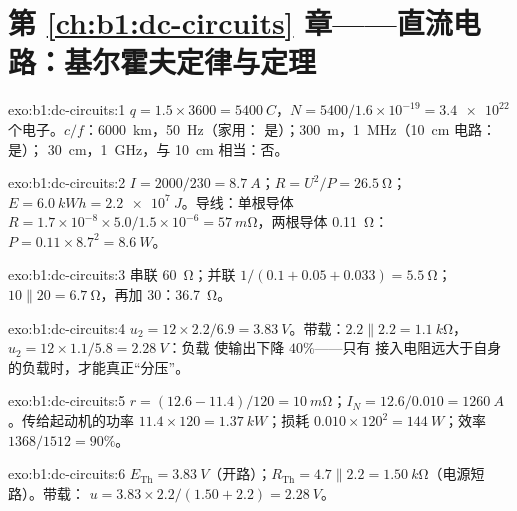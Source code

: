 \section*{第 \ref{ch:b1:dc-circuits} 章——直流电路：基尔霍夫定律与定理}

\begin{solution}{exo:b1:dc-circuits:1}
$q = 1.5 \times 3600 = \qty{5400}{C}$，$N = 5400/1.6\times10^{-19} =
\num{3.4e22}$ 个电子。$c/f$：\qty{6000}{km}，\qty{50}{Hz}（家用：
是）；\qty{300}{m}，\qty{1}{MHz}（\qty{10}{cm} 电路：是）；
\qty{30}{cm}，\qty{1}{GHz}，与 \qty{10}{cm} 相当：否。
\end{solution}

\begin{solution}{exo:b1:dc-circuits:2}
$I = 2000/230 = \qty{8.7}{A}$；$R = U^2/P = \qty{26.5}{\ohm}$；$E =
\qty{6.0}{kWh} = \qty{2.2e7}{J}$。导线：单根导体 $R = 1.7\times10^{-8}
\times 5.0/1.5\times10^{-6} = \qty{57}{m\ohm}$，两根导体
\qty{0.11}{\ohm}：$P = 0.11 \times 8.7^2 = \qty{8.6}{W}$。
\end{solution}

\begin{solution}{exo:b1:dc-circuits:3}
串联 \qty{60}{\ohm}；并联 $1/(0.1 + 0.05 + 0.033) = \qty{5.5}{\ohm}$；
$10 \parallel 20 = \qty{6.7}{\ohm}$，再加 $30$：\qty{36.7}{\ohm}。
\end{solution}

\begin{solution}{exo:b1:dc-circuits:4}
$u_2 = 12 \times 2.2/6.9 = \qty{3.83}{V}$。带载：$2.2 \parallel 2.2 =
\qty{1.1}{k\ohm}$，$u_2 = 12 \times 1.1/5.8 = \qty{2.28}{V}$：负载
使输出下降 $40\%$——只有
接入电阻远大于自身的负载时，才能真正“分压”。
\end{solution}

\begin{solution}{exo:b1:dc-circuits:5}
$r = (12.6 - 11.4)/120 = \qty{10}{m\ohm}$；$I_N = 12.6/0.010 =
\qty{1260}{A}$。传给起动机的功率 $11.4 \times 120 = \qty{1.37}{kW}$；损耗
$0.010 \times 120^2 = \qty{144}{W}$；效率 $1368/1512 = 90\%$。
\end{solution}

\begin{solution}{exo:b1:dc-circuits:6}
$E_{\mathrm{Th}} = \qty{3.83}{V}$（开路）；$R_{\mathrm{Th}}
= 4.7 \parallel 2.2 = \qty{1.50}{k\ohm}$（电源短路）。带载：
$u = 3.83 \times 2.2/(1.50 + 2.2) = \qty{2.28}{V}$。
\end{solution}

